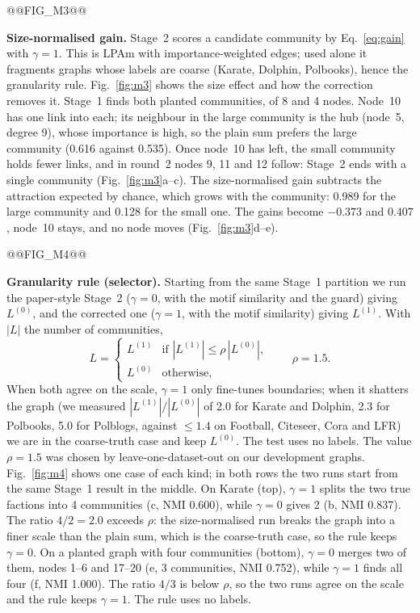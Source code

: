 \documentclass[conference]{IEEEtran}
\begin{document}
@@FIG_M3@@

\textbf{Size-normalised gain.} Stage~2 scores a candidate community by Eq.~\eqref{eq:gain} with $\gamma=1$. This is LPAm with importance-weighted edges; used alone it fragments graphs whose labels are coarse (Karate, Dolphin, Polbooks), hence the granularity rule. Fig.~\ref{fig:m3} shows the size effect and how the correction removes it. Stage~1 finds both planted communities, of 8 and 4 nodes. Node~10 has one link into each; its neighbour in the large community is the hub (node~5, degree 9), whose importance is high, so the plain sum prefers the large community (0.616 against 0.535). Once node~10 has left, the small community holds fewer links, and in round~2 nodes 9, 11 and 12 follow: Stage~2 ends with a single community (Fig.~\ref{fig:m3}a--c). The size-normalised gain subtracts the attraction expected by chance, which grows with the community: 0.989 for the large community and 0.128 for the small one. The gains become $-0.373$ and $0.407$, node~10 stays, and no node moves (Fig.~\ref{fig:m3}d--e).

@@FIG_M4@@

\textbf{Granularity rule (selector).} Starting from the same Stage~1 partition we run the paper-style Stage~2 ($\gamma=0$, with the motif similarity and the guard) giving $L^{(0)}$, and the corrected one ($\gamma=1$, with the motif similarity) giving $L^{(1)}$. With $|L|$ the number of communities,
\begin{equation}
L=\begin{cases}L^{(1)}&\text{if }|L^{(1)}|\le\rho\,|L^{(0)}|,\\ L^{(0)}&\text{otherwise,}\end{cases}\qquad\rho=1.5.\label{eq:gran}
\end{equation}
When both agree on the scale, $\gamma=1$ only fine-tunes boundaries; when it shatters the graph (we measured $|L^{(1)}|/|L^{(0)}|$ of 2.0 for Karate and Dolphin, 2.3 for Polbooks, 5.0 for Polblogs, against $\le1.4$ on Football, Citeseer, Cora and LFR) we are in the coarse-truth case and keep $L^{(0)}$. The test uses no labels. The value $\rho=1.5$ was chosen by leave-one-dataset-out on our development graphs. Fig.~\ref{fig:m4} shows one case of each kind; in both rows the two runs start from the same Stage~1 result in the middle. On Karate (top), $\gamma=1$ splits the two true factions into 4 communities (c, NMI 0.600), while $\gamma=0$ gives 2 (b, NMI 0.837). The ratio $4/2=2.0$ exceeds $\rho$: the size-normalised run breaks the graph into a finer scale than the plain sum, which is the coarse-truth case, so the rule keeps $\gamma=0$. On a planted graph with four communities (bottom), $\gamma=0$ merges two of them, nodes 1--6 and 17--20 (e, 3 communities, NMI 0.752), while $\gamma=1$ finds all four (f, NMI 1.000). The ratio $4/3$ is below $\rho$, so the two runs agree on the scale and the rule keeps $\gamma=1$. The rule uses no labels.
\end{document}
